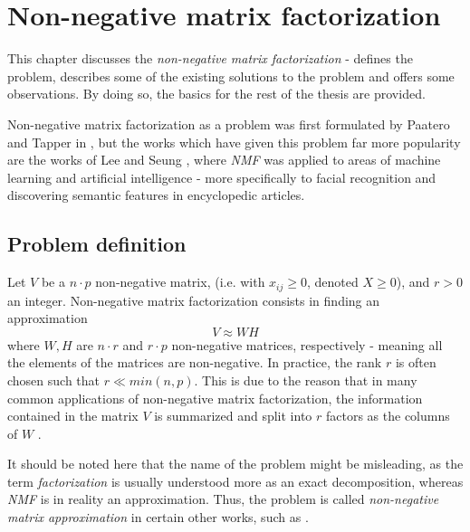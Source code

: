 \documentclass[thesis=M,english]{FITthesis}[2012/10/20]
\begin{document}
\chapter{Non-negative matrix factorization}
\label{ch:NMF}
This chapter discusses the \emph{non-negative matrix factorization} - defines
the problem, describes some of the existing solutions to the problem and
offers some observations. By doing so, the basics for the rest of the thesis are
provided.

Non-negative matrix factorization as a problem was first formulated by Paatero
and Tapper in \cite{nmf-paatero}, but the works which have given
this problem far more popularity are the works of Lee and Seung \cite{lee99}, where
\emph{NMF} was applied to areas of machine learning and artificial
intelligence - more specifically to facial recognition and discovering semantic
features in encyclopedic articles.

\section{Problem definition}
Let $V$ be a $n \cdot p$ non-negative matrix, (i.e. with $x_{ij} \geq 0$, denoted
$X \geq 0$), and $r > 0$ an integer. Non-negative matrix factorization consists in
finding an approximation
\begin{equation}
  V \approx WH
\end{equation}
where $W, H$ are $n \cdot r$ and $r \cdot p$ non-negative matrices, respectively - meaning
all the elements of the matrices are non-negative.
In practice, the rank $r$ is often chosen such that $r \ll min(n,p)$. This is due
to the reason that in many common applications of non-negative matrix factorization,
the information contained in the matrix $V$ is summarized and split into $r$ factors
as the columns of $W$ \cite{nmf-r-vignette}.

It should be noted here that the name of the problem might be misleading, as
the term \emph{factorization} is usually understood more as an exact
decomposition, whereas \emph{NMF} is in reality an approximation. Thus,
the problem is called \emph{non-negative matrix approximation} in certain
other works, such as \cite{nmf-approx}.
\end{document}
